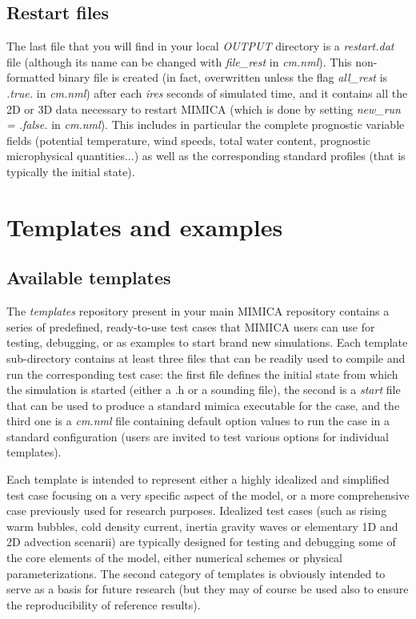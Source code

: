 \documentclass[12pt,A4,french]{article}
\begin{document}
\subsection{Restart files}

The last file that you will find in your local {\it OUTPUT} directory is a {\it restart.dat} file (although its name can be changed with {\it file\_rest} in {\it cm.nml}). This non-formatted binary file is created (in fact, overwritten unless the flag {\it all\_rest} is {\it .true.} in {\it cm.nml}) after each {\it ires} seconds of simulated time, and it contains all the 2D or 3D data necessary to restart MIMICA (which is done by setting {\it new\_run = .false.} in {\it cm.nml}). This includes in particular the complete prognostic variable fields (potential temperature, wind speeds, total water content, prognostic microphysical quantities...) as well as the corresponding standard profiles (that is typically the initial state).

\newpage
\section{Templates and examples}
\label{templates}

\subsection{Available templates}

The {\it templates} repository present in your main MIMICA repository contains a series of predefined, ready-to-use test cases that MIMICA users can use for testing, debugging, or as examples to start brand new simulations. Each template sub-directory contains at least three files that can be readily used to compile and run the corresponding test case: the first file defines the initial state from which the simulation is started (either a .h or a sounding file), the second is a {\it start} file that can be used to produce a standard mimica executable for the case, and the third one is a {\it cm.nml} file containing default option values to run the case in a standard configuration (users are invited to test various options for individual templates).

Each template is intended to represent either a highly idealized and simplified test case focusing on a very specific aspect of the model, or a more comprehensive case previously used for research purposes. Idealized test cases (such as rising warm bubbles, cold density current, inertia gravity waves or elementary 1D and 2D advection scenarii) are typically designed for testing and debugging some of the core elements of the model, either numerical schemes or physical parameterizations. The second category of templates is obviously intended to serve as a basis for future research (but they may of course be used also to ensure the reproducibility of reference results).
\end{document}
